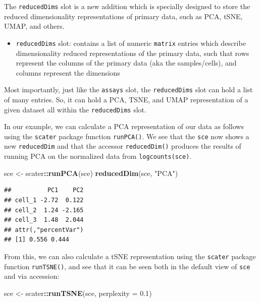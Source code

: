 \documentclass[]{book}
\newenvironment{Shaded}{\begin{snugshade}}{\end{snugshade}}
\newcommand{\DataTypeTok}[1]{\textcolor[rgb]{0.13,0.29,0.53}{#1}}
\newcommand{\FloatTok}[1]{\textcolor[rgb]{0.00,0.00,0.81}{#1}}
\newcommand{\KeywordTok}[1]{\textcolor[rgb]{0.13,0.29,0.53}{\textbf{#1}}}
\newcommand{\NormalTok}[1]{#1}
\newcommand{\OperatorTok}[1]{\textcolor[rgb]{0.81,0.36,0.00}{\textbf{#1}}}
\newcommand{\StringTok}[1]{\textcolor[rgb]{0.31,0.60,0.02}{#1}}
\providecommand{\tightlist}{%
  \setlength{\itemsep}{0pt}\setlength{\parskip}{0pt}}
\begin{document}
The \texttt{reducedDims} slot is a new addition which is specially designed to store the reduced dimensionality representations of primary data, such as PCA, tSNE, UMAP, and others.

\begin{itemize}
\tightlist
\item
  \texttt{reducedDims} slot: contains a list of numeric \texttt{matrix} entries which describe dimensionality reduced representations of the primary data, such that rows represent the columns of the primary data (aka the samples/cells), and columns represent the dimensions
\end{itemize}

Most importantly, just like the \texttt{assays} slot, the \texttt{reducedDims} slot can hold a list of many entries. So, it can hold a PCA, TSNE, and UMAP representation of a given dataset all within the \texttt{reducedDims} slot.

In our example, we can calculate a PCA representation of our data as follows using the \texttt{scater} package function \texttt{runPCA()}. We see that the \texttt{sce} now shows a new \texttt{reducedDim} and that the accessor \texttt{reducedDim()} produces the results of running PCA on the normalized data from \texttt{logcounts(sce)}.

\begin{Shaded}
\begin{Highlighting}[]
\NormalTok{sce <-}\StringTok{ }\NormalTok{scater}\OperatorTok{::}\KeywordTok{runPCA}\NormalTok{(sce)}
\KeywordTok{reducedDim}\NormalTok{(sce, }\StringTok{"PCA"}\NormalTok{)}
\end{Highlighting}
\end{Shaded}

\begin{verbatim}
##          PC1    PC2
## cell_1 -2.72  0.122
## cell_2  1.24 -2.165
## cell_3  1.48  2.044
## attr(,"percentVar")
## [1] 0.556 0.444
\end{verbatim}

From this, we can also calculate a tSNE representation using the \texttt{scater} package function \texttt{runTSNE()}, and see that it can be seen both in the default view of \texttt{sce} and via accession:

\begin{Shaded}
\begin{Highlighting}[]
\NormalTok{sce <-}\StringTok{ }\NormalTok{scater}\OperatorTok{::}\KeywordTok{runTSNE}\NormalTok{(sce, }\DataTypeTok{perplexity =} \FloatTok{0.1}\NormalTok{)}
\end{Highlighting}
\end{Shaded}
\end{document}
